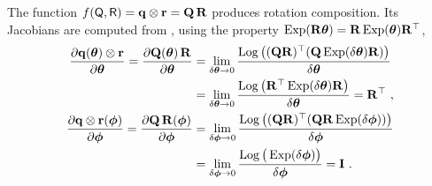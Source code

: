 The function $f(\sQ,\sR) = \bfq\ot\bfr = \bfQ\,\bfR$ produces rotation composition. Its Jacobians are computed from , using the property $\Exp(\bfR\bth)=\bfR\Exp(\bth)\bfR\tr$,
%
\begin{align*}
\dpar{\bfq(\bftheta)\ot\bfr}{\bftheta} 
=
\dpar{\bfQ(\bftheta)\,\bfR}{\bftheta} 
&= \lim_{\delta\bftheta\to0}\frac{\Log\big((\bfQ\bfR)\tr(\bfQ\Exp(\delta\bftheta)\bfR)\big)}{\delta\bftheta} \\
&= \lim_{\delta\bftheta\to0}\frac{\Log\big(\bfR\tr\Exp(\delta\bftheta)\bfR\big)}{\delta\bftheta} 
= \bfR\tr
~,
\\
\dpar{\bfq\ot\bfr(\bfphi)}{\bfphi} 
=
\dpar{\bfQ\,\bfR(\bfphi)}{\bfphi} 
&= \lim_{\delta\bfphi\to0}\frac{\Log\big((\bfQ\bfR)\tr(\bfQ\bfR\Exp(\delta\bfphi))\big)}{\delta\bfphi} \\
&= \lim_{\delta\bfphi\to0}\frac{\Log\big(\Exp(\delta\bfphi)\big)}{\delta\bfphi} 
= \bfI
~.
\end{align*}




